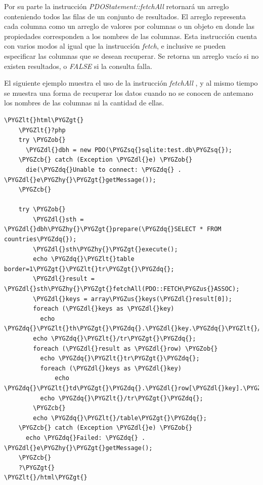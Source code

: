 \documentclass[a5paper,10pt,spanish]{sphinxmanual}
\def\PYGZus{\char`\_}
\def\PYGZob{\char`\{}
\def\PYGZcb{\char`\}}
\def\PYGZlt{\char`\<}
\def\PYGZgt{\char`\>}
\def\PYGZdl{\char`\$}
\def\PYGZhy{\char`\-}
\def\PYGZsq{\char`\'}
\def\PYGZdq{\char`\"}
\begin{document}
Por su parte la instrucción \emph{PDOStatement::fetchAll} retornará un
arreglo conteniendo todos las filas de un conjunto de resultados. El
arreglo representa cada columna como un arreglo de valores por columnas
o un objeto en donde las propiedades corresponden a los nombres de las
columnas. Esta instrucción cuenta con varios modos al igual que la
instrucción \emph{fetch}, e inclusive se pueden especificar las columnas que
se desean recuperar. Se retorna un arreglo vacío si no existen
resultados, o \emph{FALSE} si la consulta falla.

El siguiente ejemplo muestra el uso de la instrucción \emph{fetchAll} , y al
mismo tiempo se muestra una forma de recuperar los datos cuando no se
conocen de antemano los nombres de las columnas ni la cantidad de ellas.

\begin{Verbatim}[commandchars=\\\{\}]
\PYGZlt{}html\PYGZgt{}
    \PYGZlt{}?php
    try \PYGZob{}
      \PYGZdl{}dbh = new PDO(\PYGZsq{}sqlite:test.db\PYGZsq{});
    \PYGZcb{} catch (Exception \PYGZdl{}e) \PYGZob{}
      die(\PYGZdq{}Unable to connect: \PYGZdq{} . \PYGZdl{}e\PYGZhy{}\PYGZgt{}getMessage());
    \PYGZcb{}

    try \PYGZob{}
        \PYGZdl{}sth = \PYGZdl{}dbh\PYGZhy{}\PYGZgt{}prepare(\PYGZdq{}SELECT * FROM countries\PYGZdq{});
        \PYGZdl{}sth\PYGZhy{}\PYGZgt{}execute();
        echo \PYGZdq{}\PYGZlt{}table border=1\PYGZgt{}\PYGZlt{}tr\PYGZgt{}\PYGZdq{};
        \PYGZdl{}result = \PYGZdl{}sth\PYGZhy{}\PYGZgt{}fetchAll(PDO::FETCH\PYGZus{}ASSOC);
        \PYGZdl{}keys = array\PYGZus{}keys(\PYGZdl{}result[0]);
        foreach (\PYGZdl{}keys as \PYGZdl{}key)
          echo \PYGZdq{}\PYGZlt{}th\PYGZgt{}\PYGZdq{}.\PYGZdl{}key.\PYGZdq{}\PYGZlt{}/th\PYGZgt{}\PYGZdq{};
        echo \PYGZdq{}\PYGZlt{}/tr\PYGZgt{}\PYGZdq{};
        foreach (\PYGZdl{}result as \PYGZdl{}row) \PYGZob{}
          echo \PYGZdq{}\PYGZlt{}tr\PYGZgt{}\PYGZdq{};
          foreach (\PYGZdl{}keys as \PYGZdl{}key)
              echo \PYGZdq{}\PYGZlt{}td\PYGZgt{}\PYGZdq{}.\PYGZdl{}row[\PYGZdl{}key].\PYGZdq{}\PYGZlt{}/td\PYGZgt{}\PYGZdq{};
          echo \PYGZdq{}\PYGZlt{}/tr\PYGZgt{}\PYGZdq{};
        \PYGZcb{}
        echo \PYGZdq{}\PYGZlt{}/table\PYGZgt{}\PYGZdq{};
    \PYGZcb{} catch (Exception \PYGZdl{}e) \PYGZob{}
      echo \PYGZdq{}Failed: \PYGZdq{} . \PYGZdl{}e\PYGZhy{}\PYGZgt{}getMessage();
    \PYGZcb{}
    ?\PYGZgt{}
\PYGZlt{}/html\PYGZgt{}
\end{Verbatim}



\renewcommand{\indexname}{Índice}
\printindex
\end{document}
